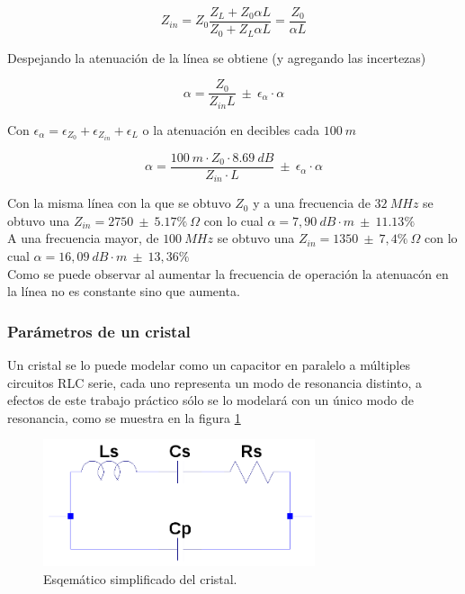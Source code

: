 \documentclass[a4paper,10pt]{article}
\begin{document}
		$$Z_{in}=Z_0\frac{Z_L+Z_0\alpha L}{Z_0+Z_L\alpha L}=\frac{Z_0}{\alpha L}$$
		
		\indent Despejando la atenuaci\'on de la l\'inea se obtiene (y agregando
		las incertezas)
		
		$$\alpha=\frac{Z_0}{Z_{in} L}~\pm~\epsilon_{\alpha}\cdot\alpha$$
		
		\indent Con $\epsilon_{\alpha}=\epsilon_{Z_0}+\epsilon_{Z_{in}}+
		\epsilon_{L}$ o la atenuaci\'on en decibles cada $100~m$
		
		$$\alpha=\frac{100~m\cdot Z_0\cdot8.69~dB}{Z_{in}\cdot L}~\pm~
		\epsilon_{\alpha}\cdot \alpha$$
		
		\indent Con la misma l\'inea con la que se obtuvo $Z_0$ y a una 
		frecuencia de $32~MHz$ se obtuvo una $Z_{in}=2750~\pm~5.17\%~\Omega$ con
		lo cual $\alpha=7,90~dB\cdot m~\pm~11.13\%$ \\
		\indent A una frecuencia mayor, de $100~MHz$ se obtuvo una 
		$Z_{in}=1350~\pm~7,4\%~\Omega$ con lo cual 
		$\alpha=16,09~dB\cdot m~\pm~13,36\%$\\
		\indent Como se puede observar al aumentar la frecuencia de operaci\'on 
		la atenuac\'on en la l\'inea no es constante sino que aumenta.
		
		\subsubsection{Par\'ametros de un cristal}	
		
		\indent Un cristal se lo puede modelar como un capacitor en paralelo a 
		múltiples circuitos RLC serie, cada uno representa un modo de resonancia
		distinto, a efectos de este trabajo práctico sólo se lo modelará con un 
		único modo de resonancia, como se muestra en la figura \ref{img004}

		\begin{figure}[!htb]
			\centering
			\includegraphics[width=8cm]{Imagenes/esqXtal.png}
			\caption{Esqemático simplificado del cristal.}
			\label{img004} 
		\end{figure}
\end{document}
